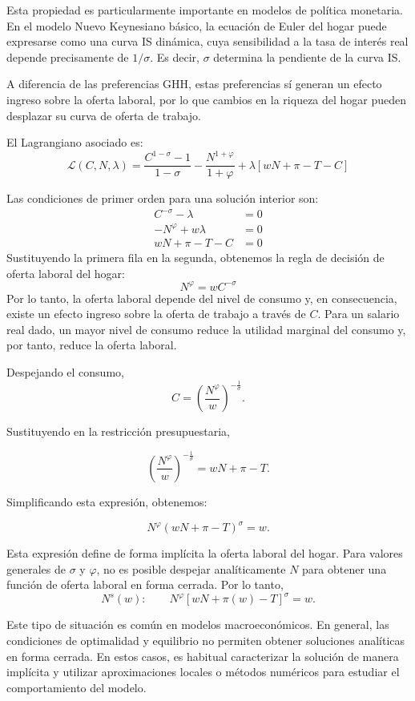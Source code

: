 \documentclass[11pt]{article}
\begin{document}
Esta propiedad es particularmente importante en modelos de política monetaria. En el modelo Nuevo Keynesiano básico, la ecuación de Euler del hogar puede expresarse como una curva IS dinámica, cuya sensibilidad a la tasa de interés real depende precisamente de $1/\sigma$. Es decir, $\sigma$ determina la pendiente de la curva IS.

A diferencia de las preferencias GHH, estas preferencias sí generan un efecto ingreso sobre la oferta laboral, por lo que cambios en la riqueza del hogar pueden desplazar su curva de oferta de trabajo.

El Lagrangiano asociado es:
$$
\mathcal{L}(C,N,\lambda)
=
\frac{C^{1-\sigma}-1}{1-\sigma} - \frac{N^{1+\varphi}}{1+\varphi} + 
\lambda
\left[ 
    wN + \pi - T - C
\right]
$$

Las condiciones de primer orden para una solución interior son:
\begin{align*}
    C^{-\sigma} - \lambda &= 0 \\[0.3em]
    -N^{\varphi} + w\lambda &= 0 \\[0.3em]
    wN + \pi - T - C &= 0
\end{align*}
Sustituyendo la primera fila en la segunda, obtenemos la regla de decisión de oferta laboral del hogar:
$$
N^{\varphi} = w C^{-\sigma}
$$
Por lo tanto, la oferta laboral depende del nivel de consumo y, en consecuencia, existe un efecto ingreso sobre la oferta de trabajo a través de $C$. Para un salario real dado, un mayor nivel de consumo reduce la utilidad marginal del consumo y, por tanto, reduce la oferta laboral.

Despejando el consumo,
\[
C
=
\left(
\frac{N^{\varphi}}{w}
\right)^{-\frac{1}{\sigma}}.
\]

Sustituyendo en la restricción presupuestaria,

\[
\left(
\frac{N^{\varphi}}{w}
\right)^{-\frac{1}{\sigma}}
=
wN+\pi-T.
\]

Simplificando esta expresión, obtenemos:

\[
N^{\varphi}
\left(
wN+\pi-T
\right)^{\sigma}
=
w.
\]

Esta expresión define de forma implícita la oferta laboral del hogar. Para valores generales de $\sigma$ y $\varphi$, no es posible despejar analíticamente $N$ para obtener una función de oferta laboral en forma cerrada. Por lo tanto,
\[
\boxed{
N^s(w):
\qquad
N^{\varphi}
\left[
wN+\pi(w)-T
\right]^{\sigma}
=
w.
}
\]

Este tipo de situación es común en modelos macroeconómicos. En general, las condiciones de optimalidad y equilibrio no permiten obtener soluciones analíticas en forma cerrada. En estos casos, es habitual caracterizar la solución de manera implícita y utilizar aproximaciones locales o métodos numéricos para estudiar el comportamiento del modelo.
\end{document}
